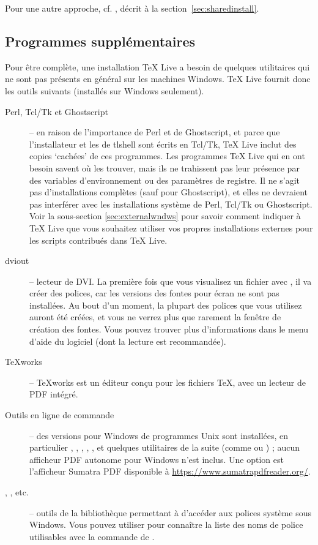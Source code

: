 \documentclass[german, english, french]{article}
\renewcommand{\TL}{\TeX{} Live\xspace}%
\begin{document}
Pour une autre approche, cf. , décrit à la
section~\ref{sec:sharedinstall}.

\subsection{Programmes supplémentaires}

Pour être complète, une installation \TL a besoin de quelques utilitaires qui ne
sont pas présents en général sur les machines Windows. \TL fournit donc les
outils suivants (installés sur Windows seulement).
\begin{description}
\item [Perl, Tcl/Tk et Ghostscript]-- en  raison de l'importance de Perl et de
  Ghostscript, et parce que l'installateur et les \GUI{} de tlshell sont écrits
  en Tcl/Tk, \TL{} inclut des copies `cachées' de ces programmes. Les programmes
  \TL{} qui en ont besoin savent où les trouver, mais ils ne trahissent pas leur
  présence par des variables d'environnement ou des paramètres de registre. Il
  ne s'agit pas d'installations complètes (sauf pour Ghostscript), et elles ne
  devraient pas interférer avec les installations système de Perl, Tcl/Tk ou
  Ghostscript. Voir la sous-section \ref{sec:externalwndws} pour savoir comment
  indiquer à \TL{} que vous souhaitez utiliser vos propres installations
  externes pour les scripts contribués dans \TL.

\item[dviout] -- lecteur de DVI. La première fois que vous visualisez un fichier
  avec , il va créer des polices, car les versions des fontes pour
  écran ne sont pas installées. Au bout d'un moment, la plupart des polices que
  vous utilisez auront été créées, et vous ne verrez plus que rarement la
  fenêtre de création des fontes. Vous pouvez trouver plus d'informations dans
  le menu d'aide du logiciel (dont la lecture est recommandée).

\item[\TeX{}works] -- \TeX{}works est un éditeur conçu pour les fichiers \TeX,
  avec un lecteur de PDF intégré.

\item[Outils en ligne de commande] -- des versions pour Windows de programmes
  Unix sont installées, en particulier , ,
  , , ,  et
  quelques utilitaires de la suite  (comme  ou
  ) ; aucun afficheur PDF autonome pour Windows n'est
  inclus. Une option est l'afficheur Sumatra PDF disponible
  à \url{https://www.sumatrapdfreader.org/}.
\item[, , etc.] -- outils de la bibliothèque
   permettant à \XeTeX{} d'accéder aux polices système sous
  Windows. Vous pouvez utiliser  pour connaître la liste des noms
  de police utilisables avec la commande  de \XeTeX.
\end{description}
\end{document}

